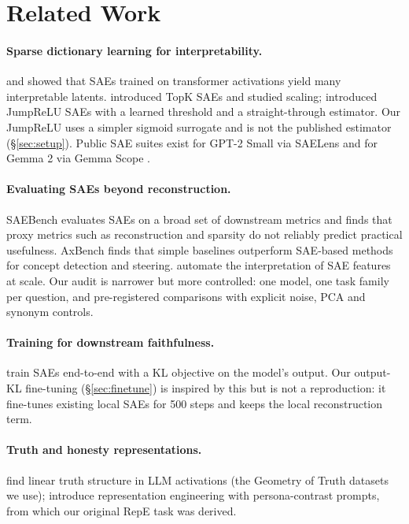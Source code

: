 \section{Related Work}\label{sec:related}

\paragraph{Sparse dictionary learning for interpretability.} \citet{bricken2023monosemanticity} and
\citet{cunningham2023sparse} showed that SAEs trained on transformer activations yield many interpretable latents.
\citet{gao2024scaling} introduced TopK SAEs and studied scaling; \citet{rajamanoharan2024jumping} introduced JumpReLU
SAEs with a learned threshold and a straight-through estimator. Our JumpReLU uses a simpler sigmoid surrogate and is
not the published estimator (\S\ref{sec:setup}). Public SAE suites exist for GPT-2 Small via SAELens
\citep{saelens2024} and for Gemma 2 via Gemma Scope \citep{gemmascope2024}.

\paragraph{Evaluating SAEs beyond reconstruction.} SAEBench \citep{karvonen2025saebench} evaluates SAEs on a broad set
of downstream metrics and finds that proxy metrics such as reconstruction and sparsity do not reliably predict
practical usefulness. AxBench \citep{wu2025axbench} finds that simple baselines outperform SAE-based methods for
concept detection and steering. \citet{paulo2024automatic} automate the interpretation of SAE features at scale. Our
audit is narrower but more controlled: one model, one task family per question, and pre-registered comparisons with
explicit noise, PCA and synonym controls.

\paragraph{Training for downstream faithfulness.} \citet{braun2024e2e} train SAEs end-to-end with a KL objective on the
model's output. Our output-KL fine-tuning (\S\ref{sec:finetune}) is inspired by this but is not a reproduction: it
fine-tunes existing local SAEs for 500 steps and keeps the local reconstruction term.

\paragraph{Truth and honesty representations.} \citet{marks2023geometry} find linear truth structure in LLM
activations (the Geometry of Truth datasets we use); \citet{zou2023representation} introduce representation
engineering with persona-contrast prompts, from which our original RepE task was derived.

